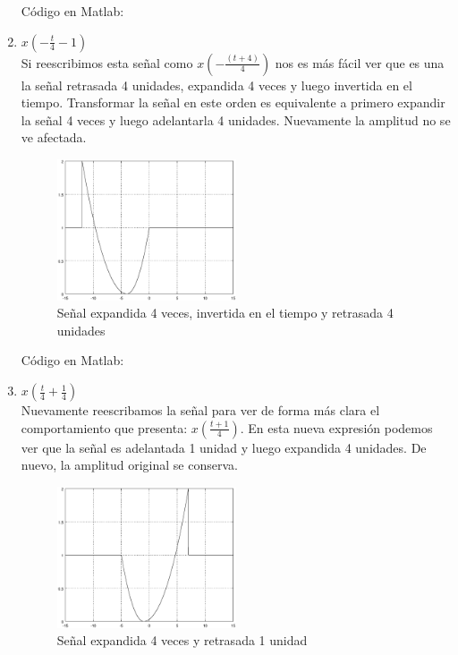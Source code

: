 \documentclass[10pt,a4paper]{report}
\begin{document}
\begin{enumerate}
Código en Matlab:
    
    
  \item $x\left(-\frac{t}{4}-1\right)$\\
  \newline Si reescribimos esta señal como $x\left(-\frac{\left(t+4\right)}{4}\right)$ nos es más fácil ver que es una la señal retrasada 4 unidades, expandida 4 veces y luego invertida en el tiempo. Transformar la señal en este orden es equivalente a primero expandir la señal 4 veces y luego adelantarla 4 unidades. Nuevamente la amplitud no se ve afectada.

    \begin{figure}[H]
      \begin{center}
        \includegraphics[width=0.5\textwidth]{./Ejercicio2/IncisoC}
        \caption{Señal expandida 4 veces, invertida en el tiempo y retrasada 4 unidades}
        \label{fig:IncisoC}
      \end{center}
    \end{figure}
    
Código en Matlab:
    
    \newpage

  \item $x\left(\frac{t}{4}+\frac{1}{4}\right)$\\
  \newline Nuevamente reescribamos la señal para ver de forma más clara el comportamiento que presenta: $x\left(\frac{t+1}{4}\right)$. En esta nueva expresión podemos ver que la señal es adelantada 1 unidad y luego expandida 4 unidades. De nuevo, la amplitud original se conserva.
    \begin{figure}[H]
      \begin{center}
        \includegraphics[width=0.5\textwidth]{./Ejercicio2/IncisoD}
        \caption{Señal expandida 4 veces y retrasada 1 unidad}
        \label{fig:IncisoD}
      \end{center}
    \end{figure}
    

\end{enumerate}
\end{document}
